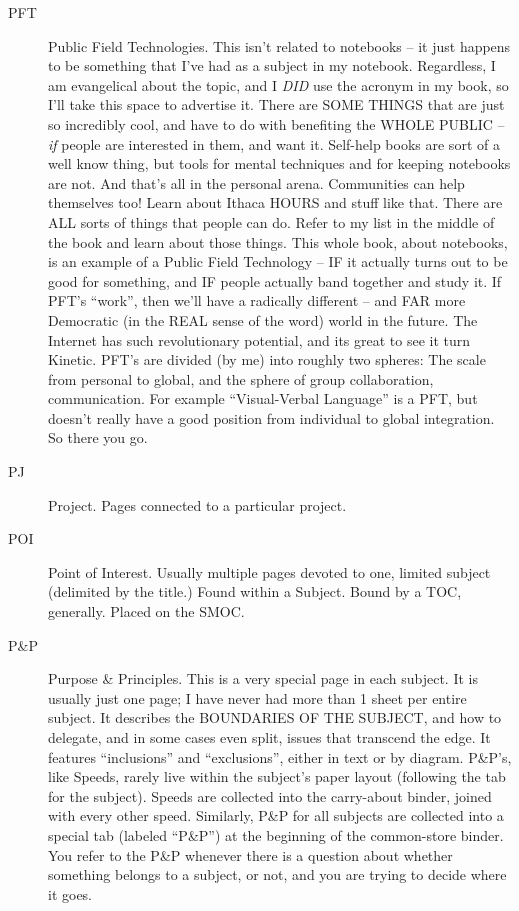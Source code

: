 \documentclass[oneside]{scrbook}
\begin{document}
\begin{description}
\item[PFT] Public Field Technologies. This isn't related to notebooks -- it
just happens to be something that I've had as a subject in my
notebook. Regardless, I am evangelical about the topic, and I \emph{DID}
use the acronym in my book, so I'll take this space to advertise
it. There are SOME THINGS that are just so incredibly cool, and have
to do with benefiting the WHOLE PUBLIC -- \emph{if} people are interested in
them, and want it. Self-help books are sort of a well know thing, but
tools for mental techniques and for keeping notebooks are not. And
that's all in the personal arena. Communities can help themselves too!
Learn about Ithaca HOURS and stuff like that. There are ALL sorts of
things that people can do. Refer to my list in the middle of the book
and learn about those things. This whole book, about notebooks, is an
example of a Public Field Technology -- IF it actually turns out to be
good for something, and IF people actually band together and study
it. If PFT's ``work'', then we'll have a radically different -- and FAR
more Democratic (in the REAL sense of the word) world in the
future. The Internet has such revolutionary potential, and its great
to see it turn Kinetic. PFT's are divided (by me) into roughly two
spheres: The scale from personal to global, and the sphere of group
collaboration, communication. For example ``Visual-Verbal Language'' is
a PFT, but doesn't really have a good position from individual to
global integration. So there you go.

\item[PJ] Project. Pages connected to a particular project.

\item[POI] Point of Interest. Usually multiple pages devoted to one,
limited subject (delimited by the title.) Found within a
Subject. Bound by a TOC, generally. Placed on the SMOC.

\item[P\&P] Purpose \& Principles. This is a very special page in each
subject. It is usually just one page; I have never had more than 1
sheet per entire subject. It describes the BOUNDARIES OF THE SUBJECT,
and how to delegate, and in some cases even split, issues that
transcend the edge. It features ``inclusions'' and ``exclusions'', either
in text or by diagram. P\&P's, like Speeds, rarely live within the
subject's paper layout (following the tab for the subject). Speeds are
collected into the carry-about binder, joined with every other
speed. Similarly, P\&P for all subjects are collected into a special
tab (labeled ``P\&P'') at the beginning of the common-store binder. You
refer to the P\&P whenever there is a question about whether something
belongs to a subject, or not, and you are trying to decide where it
goes.


\end{description}
\end{document}
